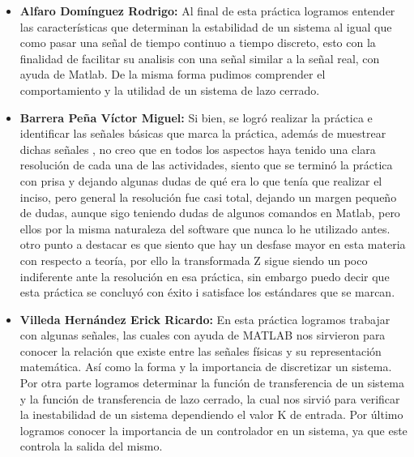 \begin{itemize}
	\item \textbf{Alfaro Domínguez Rodrigo:}
	Al final de esta práctica logramos entender las características que determinan la estabilidad de un sistema al igual que como pasar una señal de tiempo continuo a tiempo discreto, esto con la finalidad de facilitar su analisis con una señal similar a la señal real, con ayuda de Matlab. De la misma forma pudimos comprender el comportamiento y la utilidad de un sistema de lazo cerrado.
	\item \textbf{Barrera Peña Víctor Miguel:} 
	Si bien, se logró realizar la práctica e identificar las señales básicas que marca la práctica, además de muestrear dichas señales , no creo que en todos los aspectos haya tenido una clara resolución de cada una de las actividades, siento que se terminó la práctica con prisa y dejando algunas dudas de qué era lo que tenía que realizar el inciso, pero general la resolución fue casi total, dejando un margen pequeño de dudas, aunque sigo teniendo dudas de algunos comandos en Matlab, pero ellos por la misma naturaleza del software que nunca lo he utilizado antes. otro punto a destacar es que siento que hay un desfase mayor en esta materia con respecto a teoría, por ello la transformada Z sigue siendo un poco indiferente ante la resolución en esa práctica, sin embargo puedo decir que esta práctica se concluyó con éxito i satisface los estándares que se marcan.
	\item \textbf{Villeda Hernández Erick Ricardo:}
	En esta práctica logramos trabajar con algunas señales, las cuales con ayuda de MATLAB nos sirvieron para conocer la relación que existe entre las señales físicas  y su representación matemática. Así como la forma y la importancia de discretizar un sistema. Por otra parte logramos determinar la función de transferencia de un sistema y la función de transferencia de lazo cerrado, la cual nos sirvió para verificar la inestabilidad de un sistema dependiendo el valor K de entrada. Por último logramos conocer la importancia de un controlador en un sistema, ya que este controla la salida del mismo.
	
	
\end{itemize}